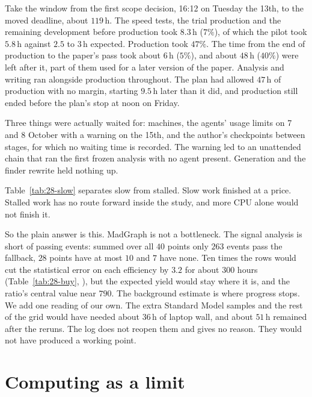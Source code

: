 Take the window from the first scope decision, 16:12 on Tuesday the 13th, to the moved deadline, about $119$\,h. The speed tests, the trial production and the remaining development before production took $8.3$\,h ($7\%$), of which the pilot took $5.8$\,h against $2.5$ to $3$\,h expected. Production took $47\%$. The time from the end of production to the paper's pass took about $6$\,h ($5\%$), and about $48$\,h ($40\%$) were left after it, part of them used for a later version of the paper. Analysis and writing ran alongside production throughout. The plan had allowed $47$\,h of production with no margin, starting $9.5$\,h later than it did, and production still ended before the plan's stop at noon on Friday.

Three things were actually waited for: machines, the agents' usage limits on 7 and 8 October with a warning on the 15th, and the author's checkpoints between stages, for which no waiting time is recorded. The warning led to an unattended chain that ran the first frozen analysis with no agent present. Generation and the finder rewrite held nothing up.

Table~\ref{tab:28-slow} separates slow from stalled. Slow work finished at a price. Stalled work has no route forward inside the study, and more CPU alone would not finish it.

So the plain answer is this. MadGraph is not a bottleneck. The signal analysis is short of passing events: summed over all $40$ points only $263$ events pass the fallback, $28$ points have at most $10$ and $7$ have none. Ten times the rows would cut the statistical error on each efficiency by $3.2$ for about $300$ hours (Table~\ref{tab:28-buy}, \EST), but the expected yield would stay where it is, and the ratio's central value near $790$. The background estimate is where progress stops. We add one reading of our own. The extra Standard Model samples and the rest of the grid would have needed about $36$\,h of laptop wall, and about $51$\,h remained after the reruns. The log does not reopen them and gives no reason. They would not have produced a working point.

\section{Computing as a limit}\label{sec:28-cpu}

